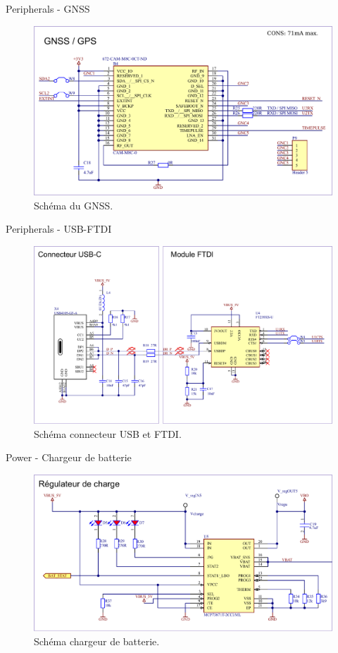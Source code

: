 \documentclass{beamer}
\begin{document}
\begin{frame}{Peripherals - GNSS}
	\begin{figure}[h]
		\centering
		\includegraphics[width=.9\linewidth]{../figures/etude/sch/GNSS}
		\caption{Schéma du GNSS.}
		\label{fig:gnss}
	\end{figure}
\end{frame}

\begin{frame}{Peripherals - USB-FTDI}
	\begin{figure}[h]
		\centering
		\includegraphics[width=.9\linewidth]{../figures/etude/sch/USB-FTDI}
		\caption{Schéma connecteur USB et FTDI.}
		\label{fig:usb-ftdi}
	\end{figure}
\end{frame}

\begin{frame}{Power - Chargeur de batterie}
	\begin{figure}[h]
		\centering
		\includegraphics[width=.9\linewidth]{../figures/etude/sch/CHRG-BAT}
		\caption{Schéma chargeur de batterie.}
		\label{fig:chrg-bat}
	\end{figure}
\end{frame}
\end{document}
